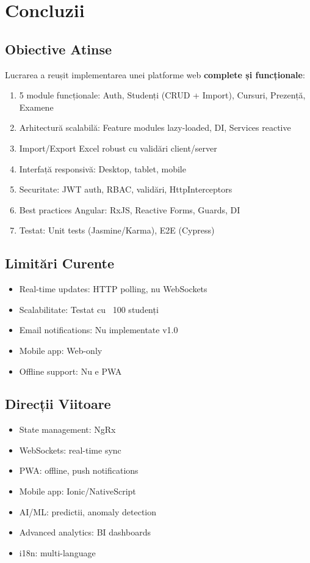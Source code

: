 \chapter{Concluzii}
\label{cap:concluzii}

\section{Obiective Atinse}

Lucrarea a reușit implementarea unei platforme web \textbf{complete și funcționale}:

\begin{enumerate}
  \item 5 module funcționale: Auth, Studenți (CRUD + Import), Cursuri, Prezență, Examene
  \item Arhitectură scalabilă: Feature modules lazy-loaded, DI, Services reactive
  \item Import/Export Excel robust cu validări client/server
  \item Interfață responsivă: Desktop, tablet, mobile
  \item Securitate: JWT auth, RBAC, validări, HttpInterceptors
  \item Best practices Angular: RxJS, Reactive Forms, Guards, DI
  \item Testat: Unit tests (Jasmine/Karma), E2E (Cypress)
\end{enumerate}

\section{Limitări Curente}

\begin{itemize}
  \item Real-time updates: HTTP polling, nu WebSockets
  \item Scalabilitate: Testat cu ~100 studenți
  \item Email notifications: Nu implementate v1.0
  \item Mobile app: Web-only
  \item Offline support: Nu e PWA
\end{itemize}

\section{Direcții Viitoare}

\begin{itemize}
  \item State management: NgRx
  \item WebSockets: real-time sync
  \item PWA: offline, push notifications
  \item Mobile app: Ionic/NativeScript
  \item AI/ML: predictii, anomaly detection
  \item Advanced analytics: BI dashboards
  \item i18n: multi-language
\end{itemize}

